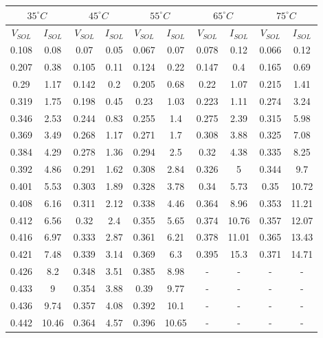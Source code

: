 \documentclass[12pt]{article}
\begin{document}
\begin{center}
 \begin{tabular}{|| c c | c c | c c | c c | c c ||} 
 \hline
 \multicolumn{2}{||c|}{\(35^{\circ}C\)} & \multicolumn{2}{c|}{\(45^{\circ}C\)} & \multicolumn{2}{c||}{\(55^{\circ}C\)} & \multicolumn{2}{c||}{\(65^{\circ}C\)} & \multicolumn{2}{c||}{\(75^{\circ}C\)}\\
 \hline
 \hline
 \( V_{SOL} \) & \( I_{SOL} \) & \( V_{SOL} \) & \( I_{SOL} \) & \( V_{SOL} \) & \( I_{SOL} \) & \( V_{SOL} \) & \( I_{SOL} \) & \( V_{SOL} \) & \( I_{SOL} \) \\ [0.25ex] 
 \hline\hline
 \hline 
0.108 & 0.08 & 0.07 & 0.05 & 0.067 & 0.07 & 0.078 & 0.12 & 0.066 & 0.12 \\ \hline 
0.207 & 0.38 & 0.105 & 0.11 & 0.124 & 0.22 & 0.147 & 0.4 & 0.165 & 0.69 \\ \hline 
0.29 & 1.17 & 0.142 & 0.2 & 0.205 & 0.68 & 0.22 & 1.07 & 0.215 & 1.41 \\ \hline 
0.319 & 1.75 & 0.198 & 0.45 & 0.23 & 1.03 & 0.223 & 1.11 & 0.274 & 3.24 \\ \hline 
0.346 & 2.53 & 0.244 & 0.83 & 0.255 & 1.4 & 0.275 & 2.39 & 0.315 & 5.98 \\ \hline 
0.369 & 3.49 & 0.268 & 1.17 & 0.271 & 1.7 & 0.308 & 3.88 & 0.325 & 7.08 \\ \hline 
0.384 & 4.29 & 0.278 & 1.36 & 0.294 & 2.5 & 0.32 & 4.38 & 0.335 & 8.25 \\ \hline 
0.392 & 4.86 & 0.291 & 1.62 & 0.308 & 2.84 & 0.326 & 5 & 0.344 & 9.7 \\ \hline 
0.401 & 5.53 & 0.303 & 1.89 & 0.328 & 3.78 & 0.34 & 5.73 & 0.35 & 10.72 \\ \hline 
0.408 & 6.16 & 0.311 & 2.12 & 0.338 & 4.46 & 0.364 & 8.96 & 0.353 & 11.21 \\ \hline 
0.412 & 6.56 & 0.32 & 2.4 & 0.355 & 5.65 & 0.374 & 10.76 & 0.357 & 12.07 \\ \hline 
0.416 & 6.97 & 0.333 & 2.87 & 0.361 & 6.21 & 0.378 & 11.01 & 0.365 & 13.43 \\ \hline 
0.421 & 7.48 & 0.339 & 3.14 & 0.369 & 6.3 & 0.395 & 15.3 & 0.371 & 14.71 \\ \hline 
0.426 & 8.2 & 0.348 & 3.51 & 0.385 & 8.98 & - & - & - & - \\ \hline 
0.433 & 9 & 0.354 & 3.88 & 0.39 & 9.77 & - & - & - & - \\ \hline 
0.436 & 9.74 & 0.357 & 4.08 & 0.392 & 10.1 & - & - & - & - \\ \hline 
0.442 & 10.46 & 0.364 & 4.57 & 0.396 & 10.65 & - & - & - & - \\ \hline 

\end{tabular}
\end{center}
\end{document}
